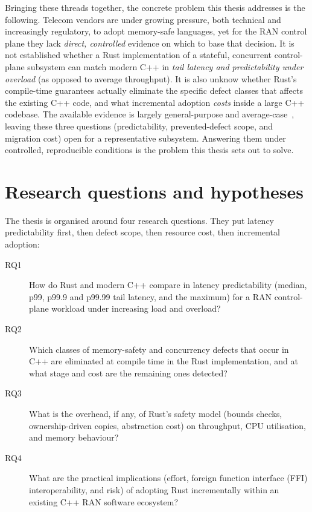 \documentclass[english,oneside,a4paper,censored,csm,software-track-2020]{HYthesisML}
\begin{document}
Bringing these threads together, the concrete problem this thesis addresses is the following.
Telecom vendors are under growing pressure, both technical and increasingly regulatory, to adopt
memory-safe languages, yet for the RAN control plane they lack \emph{direct, controlled}
evidence on which to base that decision. It is not established whether a Rust implementation of
a stateful, concurrent control-plane subsystem can match modern C++ in \emph{tail latency and
predictability under overload} (as opposed to average throughput). It is also unknow whether Rust's compile-time
guarantees actually eliminate the specific defect classes that affects the existing C++ code,
and what incremental adoption \emph{costs} inside a large C++ codebase. The available evidence
is largely general-purpose and average-case~\cite{balasubramanian2017rust,qin2020rust}, leaving
these three questions (predictability, prevented-defect scope, and migration cost) open for a
representative subsystem. Answering them under controlled, reproducible conditions is the
problem this thesis sets out to solve.

\section{Research questions and hypotheses}\label{sec:rqs}
The thesis is organised around four research questions. They put latency predictability
first, then defect scope, then resource cost, then incremental adoption:

\begin{description}
  \item[RQ1] How do Rust and modern C++ compare in latency predictability (median, p99,
        p99.9 and p99.99 tail latency, and the maximum) for a RAN control-plane workload
        under increasing load and overload?
  \item[RQ2] Which classes of memory-safety and concurrency defects that occur in C++ are
        eliminated at compile time in the Rust implementation, and at what stage and cost
        are the remaining ones detected?
  \item[RQ3] What is the overhead, if any, of Rust's safety model (bounds checks,
        ownership-driven copies, abstraction cost) on throughput, CPU utilisation, and
        memory behaviour?
  \item[RQ4] What are the practical implications (effort, foreign function interface (FFI)
        interoperability, and risk) of adopting Rust incrementally within an existing C++ RAN
        software ecosystem?
\end{description}
\end{document}
